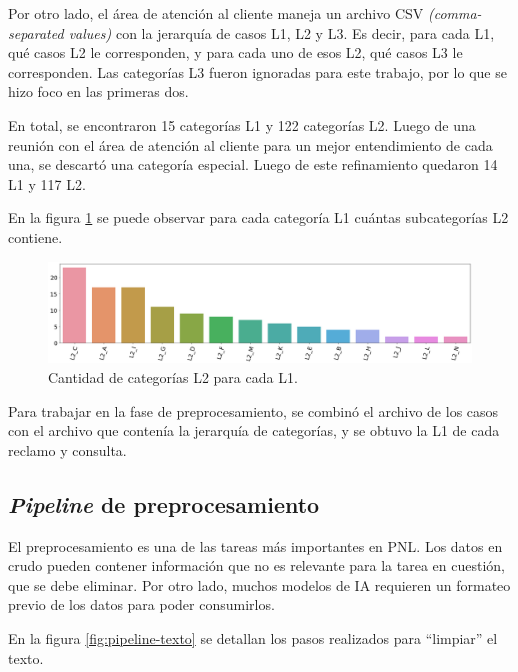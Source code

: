 Por otro lado, el área de atención al cliente maneja un archivo CSV \textit{(comma-separated values)} con la jerarquía de casos L1, L2 y L3. Es decir, para cada L1, qué casos L2 le corresponden, y para cada uno de esos L2, qué casos L3 le corresponden. Las categorías L3 fueron ignoradas para este trabajo, por lo que se hizo foco en las primeras dos.

En total, se encontraron 15 categorías L1 y 122 categorías L2. Luego de una reunión con el área de atención al cliente para un mejor entendimiento de cada una, se descartó una categoría especial. Luego de este refinamiento quedaron 14 L1 y 117 L2.

En la figura \ref{fig:catl2porl1} se puede observar para cada categoría L1 cuántas subcategorías L2 contiene.

\begin{figure}[htbp]
	\centering
	\includegraphics[width=1\textwidth]{./Figures/catl2porl1.png}
	\caption{Cantidad de categorías L2 para cada L1.}
	\label{fig:catl2porl1}
\end{figure}

Para trabajar en la fase de preprocesamiento, se combinó el archivo de los casos con el archivo que contenía la jerarquía de categorías, y se obtuvo la L1 de cada reclamo y consulta.

\subsection{\textit{Pipeline} de preprocesamiento}

El preprocesamiento es una de las tareas más importantes en PNL. Los datos en crudo pueden contener información que no es relevante para la tarea en cuestión, que se debe eliminar. Por otro lado, muchos modelos de IA requieren un formateo previo de los datos para poder consumirlos.

En la figura \ref{fig:pipeline-texto} se detallan los pasos realizados para ``limpiar'' el texto.

